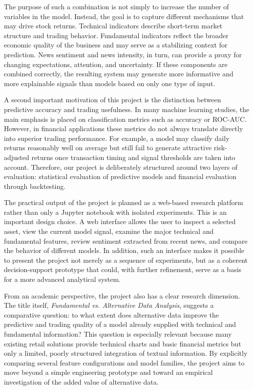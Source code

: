 \documentclass[12pt,a4paper]{article}
\begin{document}
The purpose of such a combination is not simply to increase the number of variables in the model. Instead, the goal is to capture different mechanisms that may drive stock returns. Technical indicators describe short-term market structure and trading behavior. Fundamental indicators reflect the broader economic quality of the business and may serve as a stabilizing context for prediction. News sentiment and news intensity, in turn, can provide a proxy for changing expectations, attention, and uncertainty. If these components are combined correctly, the resulting system may generate more informative and more explainable signals than models based on only one type of input.

A second important motivation of this project is the distinction between predictive accuracy and trading usefulness. In many machine learning studies, the main emphasis is placed on classification metrics such as accuracy or ROC-AUC. However, in financial applications these metrics do not always translate directly into superior trading performance. For example, a model may classify daily returns reasonably well on average but still fail to generate attractive risk-adjusted returns once transaction timing and signal thresholds are taken into account. Therefore, our project is deliberately structured around two layers of evaluation: statistical evaluation of predictive models and financial evaluation through backtesting.

The practical output of the project is planned as a web-based research platform rather than only a Jupyter notebook with isolated experiments. This is an important design choice. A web interface allows the user to inspect a selected asset, view the current model signal, examine the major technical and fundamental features, review sentiment extracted from recent news, and compare the behavior of different models. In addition, such an interface makes it possible to present the project not merely as a sequence of experiments, but as a coherent decision-support prototype that could, with further refinement, serve as a basis for a more advanced analytical system.

From an academic perspective, the project also has a clear research dimension. The title itself, \textit{Fundamental vs. Alternative Data Analysis}, suggests a comparative question: to what extent does alternative data improve the predictive and trading quality of a model already supplied with technical and fundamental information? This question is especially relevant because many existing retail solutions provide technical charts and basic financial metrics but only a limited, poorly structured integration of textual information. By explicitly comparing several feature configurations and model families, the project aims to move beyond a simple engineering prototype and toward an empirical investigation of the added value of alternative data.
\end{document}
